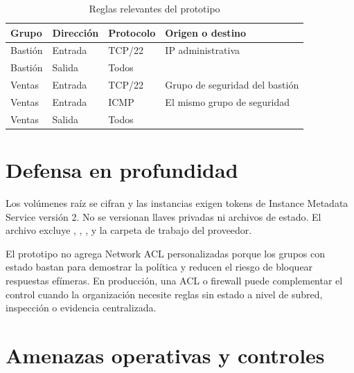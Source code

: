 \begin{table}[H]
\centering
\caption{Reglas relevantes del prototipo}
\begin{tabularx}{\textwidth}{p{2.7cm}p{2.0cm}p{2.2cm}Y}
\toprule
\textbf{Grupo} & \textbf{Dirección} & \textbf{Protocolo} & \textbf{Origen o destino} \\
\midrule
Bastión & Entrada & TCP/22 & IP administrativa  \\
Bastión & Salida & Todos &  \\
Ventas & Entrada & TCP/22 & Grupo de seguridad del bastión \\
Ventas & Entrada & ICMP & El mismo grupo de seguridad \\
Ventas & Salida & Todos &  \\
\bottomrule
\end{tabularx}
\end{table}

\section{Defensa en profundidad}

Los volúmenes raíz se cifran y las instancias exigen tokens de Instance Metadata Service versión 2. No se versionan llaves privadas ni archivos de estado. El archivo  excluye , , ,  y la carpeta de trabajo del proveedor.

El prototipo no agrega Network ACL personalizadas porque los grupos con estado bastan para demostrar la política y reducen el riesgo de bloquear respuestas efímeras. En producción, una ACL o firewall puede complementar el control cuando la organización necesite reglas sin estado a nivel de subred, inspección o evidencia centralizada.

\section{Amenazas operativas y controles}


